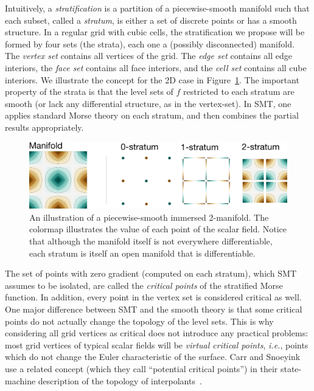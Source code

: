 Intuitively, a \emph{stratification} is a partition of a
piecewise-smooth manifold such that each subset, called a
\emph{stratum}, is either a set of discrete points or has a smooth
structure.  In a regular grid with cubic cells, the stratification we
propose will be formed by four sets (the strata), each one a (possibly
disconnected) manifold.  The \emph{vertex set} contains all vertices
of the grid. The \emph{edge set} contains all edge interiors, the
\emph{face set} contains all face interiors, and the \emph{cell set}
contains all cube interiors. We illustrate the concept for the 2D case
in Figure~\ref{fig:stratification}.  The important property of the
strata is that the level sets of $f$ restricted to each stratum are
smooth (or lack any differential structure, as in the vertex-set). In
SMT, one applies standard Morse theory on each stratum, and then
combines the partial results appropriately.

\begin{figure}[t]
\includegraphics[width=\linewidth]{chapter3/figures/stratification.png}
\caption{\label{fig:stratification}An illustration of a
  piecewise-smooth immersed 2-manifold. The colormap illustrates the
  value of each point of the scalar field. Notice that although the manifold
  itself is not everywhere differentiable, each stratum is itself an open
  manifold that is differentiable.}
\end{figure}

The set of points with zero gradient (computed on each stratum), which
SMT assumes to be isolated, are called the \emph{critical points} of
the stratified Morse function. In addition, every point in the vertex
set is considered critical as well. One major difference between SMT
and the smooth theory is that some critical points do not actually
change the topology of the level sets. This is why considering all
grid vertices as critical does not introduce any practical problems:
most grid vertices of typical scalar fields will be \emph{virtual
  critical points}, {\em i.e.}, points which do not change the Euler
characteristic of the surface. Carr and Snoeyink use a
related concept (which they call ``potential critical points'') in
their state-machine description of the topology of
interpolants~\cite{CS08}.

